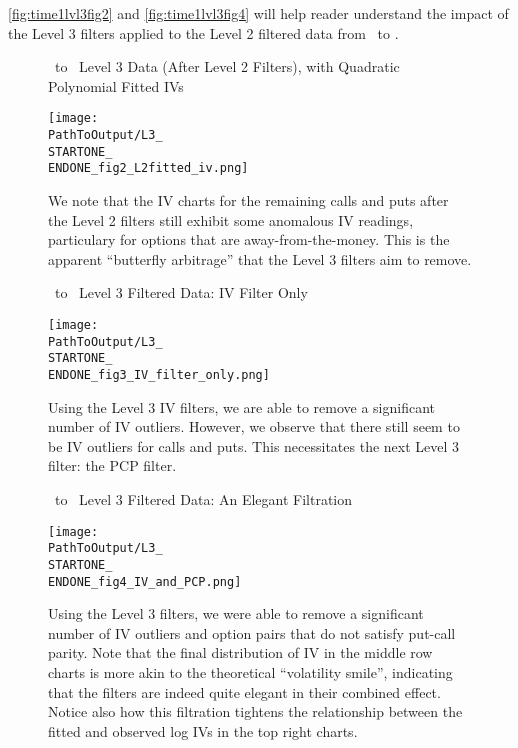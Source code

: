 \autoref{fig:time1lvl3fig2} and \autoref{fig:time1lvl3fig4} will help reader understand the impact of the Level 3 filters applied to the Level 2 filtered data from \STARTONE\ to \ENDONE.

\begin{figure}[htbp]
  \centering
  \caption{\STARTONE\ to \ENDONE\ Level 3 Data (After Level 2 Filters), with Quadratic Polynomial Fitted IVs}
  \texttt{[image: \\PathToOutput/L3\_\\STARTONE\_\\ENDONE\_fig2\_L2fitted\_iv.png]}
  \caption*{We note that the IV charts for the remaining calls and puts after the Level 2 filters still exhibit some anomalous IV readings, particulary for options that are away-from-the-money. This is the apparent ``butterfly arbitrage'' that the Level 3 filters aim to remove.}
  \label{fig:time1lvl3fig2}
\end{figure}
\clearpage


\begin{figure}[htbp]
  \centering
  \caption{\STARTONE\ to \ENDONE\ Level 3 Filtered Data: IV Filter Only}
  \texttt{[image: \\PathToOutput/L3\_\\STARTONE\_\\ENDONE\_fig3\_IV\_filter\_only.png]}
  \caption*{Using the Level 3 IV filters, we are able to remove a significant number of IV outliers. However, we observe that there still seem to be IV outliers for calls and puts. This necessitates the next Level 3 filter: the PCP filter.}
  \label{fig:time1lvl3fig3}
\end{figure}

\clearpage


\begin{figure}[htbp]
  \centering
  \caption{\STARTONE\ to \ENDONE\ Level 3 Filtered Data: An Elegant Filtration}
  \texttt{[image: \\PathToOutput/L3\_\\STARTONE\_\\ENDONE\_fig4\_IV\_and\_PCP.png]}
  \caption*{Using the Level 3 filters, we were able to remove a significant number of IV outliers and option pairs that do not satisfy put-call parity. Note that the final distribution of IV in the middle row charts is more akin to the theoretical ``volatility smile'', indicating that the filters are indeed quite elegant in their combined effect. Notice also how this filtration tightens the relationship between the fitted and observed log IVs in the top right charts.}
  \label{fig:time1lvl3fig4}
\end{figure}

